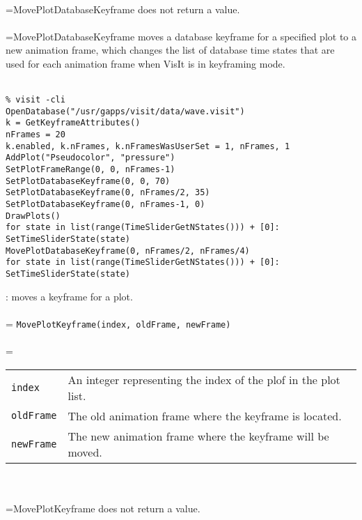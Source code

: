 \documentclass[10pt,a4paper]{report}
\begin{document}
 \\ 
\hangindent=\parindent MovePlotDatabaseKeyframe does not return a value. \\[-3mm] 

 \\ 
\hangindent=\parindent MovePlotDatabaseKeyframe moves a database keyframe for a specified plot to a new animation frame, which changes the list of database time states that are used for each animation frame when VisIt is in keyframing mode. \\[-3mm] 

\\[-6mm]
\begin{verbatim}% visit -cli
OpenDatabase("/usr/gapps/visit/data/wave.visit")
k = GetKeyframeAttributes()
nFrames = 20
k.enabled, k.nFrames, k.nFramesWasUserSet = 1, nFrames, 1
AddPlot("Pseudocolor", "pressure")
SetPlotFrameRange(0, 0, nFrames-1)
SetPlotDatabaseKeyframe(0, 0, 70)
SetPlotDatabaseKeyframe(0, nFrames/2, 35)
SetPlotDatabaseKeyframe(0, nFrames-1, 0)
DrawPlots()
for state in list(range(TimeSliderGetNStates())) + [0]:
SetTimeSliderState(state)
MovePlotDatabaseKeyframe(0, nFrames/2, nFrames/4)
for state in list(range(TimeSliderGetNStates())) + [0]:
SetTimeSliderState(state)
\end{verbatim}
\newpage


{}
: moves a keyframe for a plot.\\[-3mm]

 \\ 
\hangindent=\parindent 
\verb!MovePlotKeyframe(index, oldFrame, newFrame)!\\ [-3mm]

 \\ 
\hangindent=\parindent 
\begin{tabular}{lp{9cm}}
\verb!index! & An integer representing the index of the plof in the plot list. \\
\verb!oldFrame! & The old animation frame where the keyframe is located. \\
\verb!newFrame! & The new animation frame where the keyframe will be moved. \\
\end{tabular} \\[-2mm]


 \\ 
\hangindent=\parindent MovePlotKeyframe does not return a value. \\[-3mm] 
\end{document}
